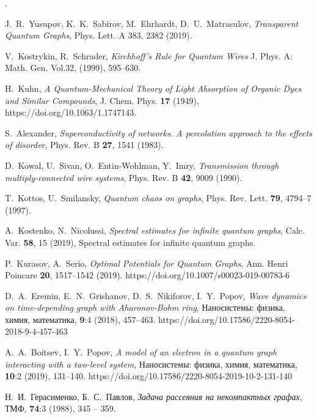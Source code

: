 \documentclass[a4 paper, 12 pt]{extarticle}
\begin{document}
   
\newpage.
\renewcommand{\refname}{ЛИТЕРАТУРА}
\begin{thebibliography}{1} %
	
	 J.~R.~Yusupov, K.~K.~Sabirov, M.~Ehrhardt, D.~U.~Matrasulov, {\it Transparent Quantum Graphs}, Phys. Lett. A 383, 2382 (2019).
	
	 V.~Kostrykin, R.~Schrader, {\it Kirchhoff's Rule for Quantum Wires} J. Phys. A: Math. Gen. Vol.32, (1999), 595--630.
	
	 H.~Kuhn, {\it A Quantum-Mechanical Theory of Light Absorption of Organic Dyes and Similar Compounds}, J. Chem. Phys. \textbf{17} (1949), https://doi.org/10.1063/1.1747143.
	
	 S.~Alexander, {\it Superconductivity of networks. A percolation approach to the effects of disorder}, Phys. Rev. B \textbf{27}, 1541 (1983).
	
	 D.~Kowal, U.~Sivan, O.~Entin-Wohlman, Y.~Imry, {\it Transmission through multiply-connected wire systems}, Phys. Rev. B \textbf{42}, 9009 (1990).

	 T.~Kottos, U.~Smilansky, {\it Quantum chaos on graphs}, Phys. Rev. Lett. \textbf{79}, 4794--7 (1997).
	
	 A.~Kostenko, N.~Nicolussi, {\it Spectral estimates for infinite quantum graphs}, Calc. Var. \textbf{58}, 15 (2019), Spectral estimates for infinite quantum graphs.
	
	  P.~Kurasov, A.~Serio, {\it Optimal Potentials for Quantum Graphs}, Ann. Henri Poincare \textbf{20}, 1517--1542 (2019). https://doi.org/10.1007/s00023-019-00783-6
	
	 D.~A.~Eremin, E.~N.~Grishanov, D.~S.~Nikiforov, I.~Y.~Popov, {\it Wave dynamics on time-depending graph with Aharonov-Bohm ring}, Наносистемы: физика, химия, математика, \textbf{9}:4 (2018), 457--463. https://doi.org/10.17586/2220-8054-2018-9-4-457-463
	
	 A.~A.~Boitsev, I.~Y.~Popov, {\it A model of an electron in a quantum graph interacting with a two-level system}, Наносистемы: физика, химия, математика, \textbf{10}:2 (2019), 131--140. https://doi.org/10.17586/2220-8054-2019-10-2-131-140
	
	 Н.~И.~Герасименко, Б.~С.~Павлов, {\it Задача рассеяния на некомпактных графах}, ТМФ, \textbf{74}:3 (1988), 345 -- 359.
	

\end{thebibliography}
\end{document}
